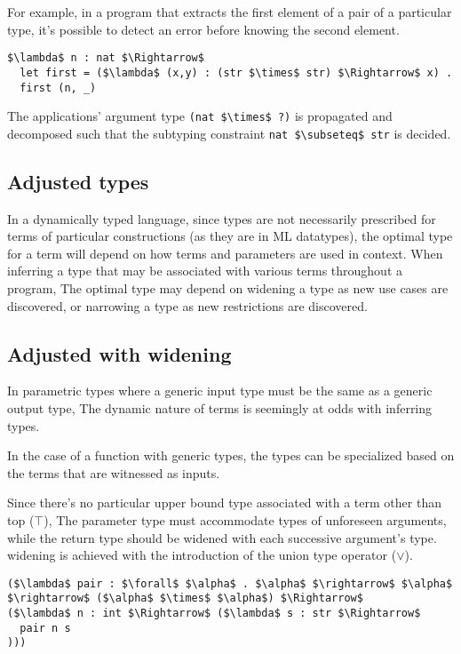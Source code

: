 \documentclass[sigplan]{acmart}
\theoremstyle{definition}
\begin{document}
For example, in a program that extracts 
the first element of a pair of a particular type, 
it's possible to detect an error before knowing the second element.

\begin{lstlisting}
$\lambda$ n : nat $\Rightarrow$
  let first = ($\lambda$ (x,y) : (str $\times$ str) $\Rightarrow$ x) .
  first (n, _) 
\end{lstlisting}

\noindent The  applications' argument type \lstinline{(nat $\times$ ?)} 
is propagated and decomposed such that the subtyping constraint 
\lstinline{nat $\subseteq$ str} is decided. 

\subsection{Adjusted types}

In a dynamically typed language, since types are not necessarily prescribed
for terms of particular constructions (as they are in ML datatypes), 
the optimal type for a term will depend on how terms and parameters are used in context. 
When inferring a type that may be associated with various terms throughout a program,  
The optimal type may depend on widening a type as new use cases are discovered,
or narrowing a type as new restrictions are discovered. 

\subsection{Adjusted with widening}

In parametric types where a generic input type must be the same as a generic output type,
The dynamic nature of terms is seemingly at odds with inferring types.

In the case of a function with generic types, 
the types can be specialized based on the terms that are witnessed as inputs. 

Since there's no particular upper bound type associated with 
a term other than top ($\top$), 
The parameter type must accommodate types of unforeseen arguments, 
while the return type should be widened with each successive
argument's type.
widening is achieved with the introduction of the union type operator ($\vee$).

\begin{lstlisting}
($\lambda$ pair : $\forall$ $\alpha$ . $\alpha$ $\rightarrow$ $\alpha$ $\rightarrow$ ($\alpha$ $\times$ $\alpha$) $\Rightarrow$ 
($\lambda$ n : int $\Rightarrow$ ($\lambda$ s : str $\Rightarrow$ 
  pair n s
)))
\end{lstlisting}
\end{document}
